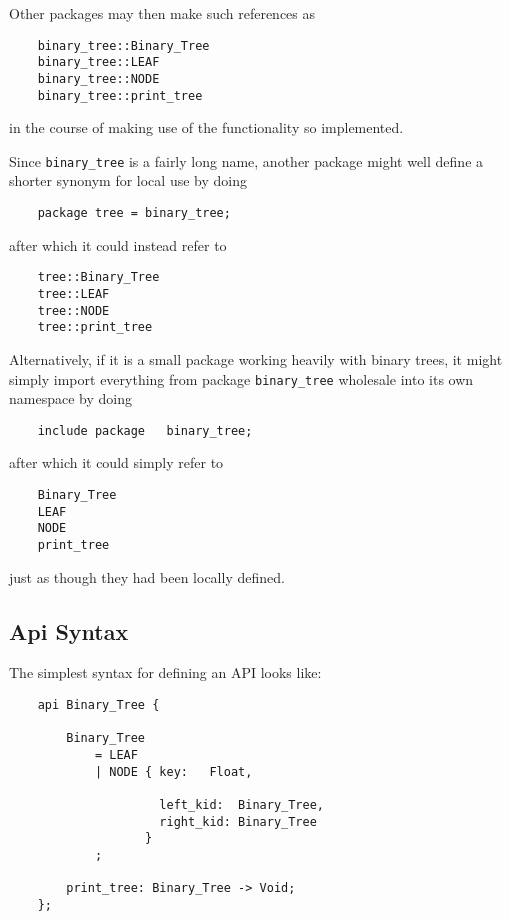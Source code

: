 Other packages may then make such references as

\begin{verbatim}
    binary_tree::Binary_Tree
    binary_tree::LEAF
    binary_tree::NODE
    binary_tree::print_tree
\end{verbatim}

in the course of making use of the functionality so implemented.

Since {\tt binary\_tree} is a fairly long name, another package might 
well define a shorter synonym for local use by doing

\begin{verbatim}
    package tree = binary_tree;
\end{verbatim}

after which it could instead refer to

\begin{verbatim}
    tree::Binary_Tree
    tree::LEAF
    tree::NODE
    tree::print_tree
\end{verbatim}

Alternatively, if it is a small package working heavily with binary trees, 
it might simply import everything from package {\tt binary\_tree} wholesale 
into its own namespace by doing

\begin{verbatim}
    include package   binary_tree;
\end{verbatim}

after which it could simply refer to

\begin{verbatim}
    Binary_Tree
    LEAF
    NODE
    print_tree
\end{verbatim}

just as though they had been locally defined.


\cutend*

\subsection{Api Syntax}
\label{section:ref:api-syntax}

The simplest syntax for defining an API looks like:

\begin{verbatim}
    api Binary_Tree {

        Binary_Tree
            = LEAF
            | NODE { key:   Float,

                     left_kid:  Binary_Tree,
                     right_kid: Binary_Tree
                   }
            ;

        print_tree: Binary_Tree -> Void;
    };
\end{verbatim}

